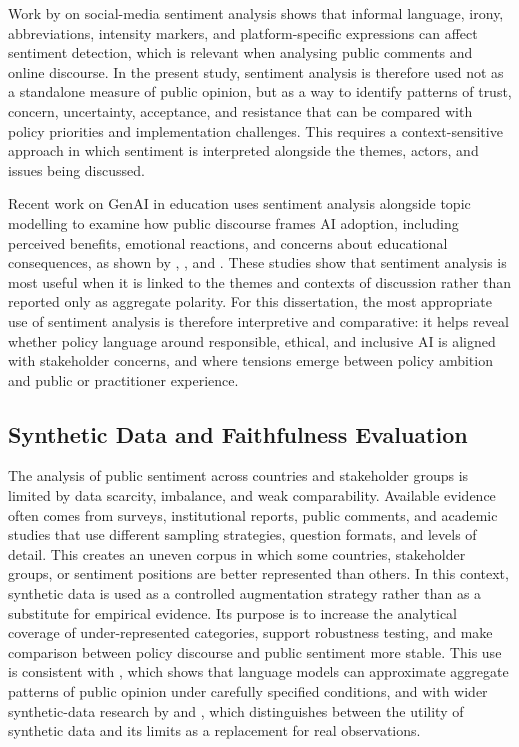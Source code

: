 Work by \cite{hutto2014vader} on social-media sentiment analysis shows that informal
language, irony, abbreviations, intensity markers, and platform-specific expressions
can affect sentiment detection, which is relevant when analysing public comments and
online discourse. In the present study, sentiment analysis is therefore used not as a
standalone measure of public opinion, but as a way to identify patterns of trust,
concern, uncertainty, acceptance, and resistance that can be compared with policy
priorities and implementation challenges. This requires a context-sensitive approach
in which sentiment is interpreted alongside the themes, actors, and issues being
discussed.

Recent work on GenAI in education uses sentiment analysis alongside topic modelling
to examine how public discourse frames AI adoption, including perceived benefits,
emotional reactions, and concerns about educational consequences, as shown by
\cite{so2024public}, \cite{liao2025public}, and \cite{gocen2024public}. These studies
show that sentiment analysis is most useful when it is linked to the themes and
contexts of discussion rather than reported only as aggregate polarity. For this
dissertation, the most appropriate use of sentiment analysis is therefore
interpretive and comparative: it helps reveal whether policy language around
responsible, ethical, and inclusive AI is aligned with stakeholder concerns, and
where tensions emerge between policy ambition and public or practitioner experience.


\subsection{Synthetic Data and Faithfulness Evaluation}

The analysis of public sentiment across countries and stakeholder groups is limited
by data scarcity, imbalance, and weak comparability. Available evidence often comes
from surveys, institutional reports, public comments, and academic studies that use
different sampling strategies, question formats, and levels of detail. This creates
an uneven corpus in which some countries, stakeholder groups, or sentiment positions
are better represented than others. In this context, synthetic data is used as a
controlled augmentation strategy rather than as a substitute for empirical evidence.
Its purpose is to increase the analytical coverage of under-represented categories,
support robustness testing, and make comparison between policy discourse and public
sentiment more stable. This use is consistent with \cite{argyle2023out}, which shows
that language models can approximate aggregate patterns of public opinion under
carefully specified conditions, and with wider synthetic-data research by
\cite{snoke2018general} and \cite{stanley2024synthetic}, which distinguishes between
the utility of synthetic data and its limits as a replacement for real observations.

